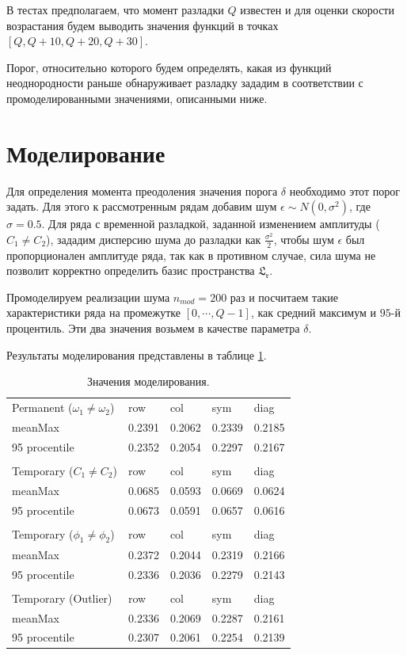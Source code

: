 \documentclass[specialist, substylefile = spbu.rtx,
			   subf, href, 12pt]{disser}
\begin{document}
В тестах предполагаем, что момент разладки $Q$ известен и для оценки скорости возрастания будем выводить значения функций в точках $[Q, Q+10, Q+20, Q+30]$.

Порог, относительно которого будем определять, какая из функций неоднородности раньше обнаруживает разладку зададим в  соответствии с промоделированными значениями, описанными ниже.

\section{Моделирование}
Для определения момента преодоления значения порога $\delta$ необходимо этот порог задать. Для этого к рассмотренным рядам добавим шум $\epsilon\sim N(0, \sigma^2)$, где $\sigma = 0.5$. Для ряда с временной разладкой, заданной изменением амплитуды ($C_1 \neq C_2$), зададим дисперсию шума до разладки как $\frac{\sigma^2}{2}$, чтобы шум $\epsilon$ был пропорционален амплитуде ряда, так как в противном случае, сила шума не позволит корректно определить базис пространства $ \mathfrak{L_r} $. 

Промоделируем реализации шума $n_{mod}=200$ раз и посчитаем такие характеристики ряда на промежутке $[0, \cdots, Q-1]$, как средний максимум и $95$-й процентиль. Эти два значения возьмем в качестве параметра $\delta$. 

Результаты моделирования представлены в таблице \ref{tab:ModellingResults}.
\begin{table}[!hhh]
	\center
	\caption{Значения моделирования.}
	\begin{tabular}{lllll}
	    Permanent ($\omega_1 \neq \omega_2$) & row & col & sym & diag \\
	    meanMax & 0.2391 & 0.2062 & 0.2339 & 0.2185 \\
	    95 procentile & 0.2352 & 0.2054 & 0.2297 & 0.2167 \\
	    &  &  &  &  \\
	    Temporary ($C_1 \neq C_2$) & row & col & sym & diag \\
	    meanMax & 0.0685 & 0.0593 & 0.0669 & 0.0624 \\
	    95 procentile & 0.0673 & 0.0591 & 0.0657 & 0.0616 \\
	    &  &  &  &  \\
	    Temporary ($\phi_1 \neq \phi_2$) & row & col & sym & diag \\
	    meanMax & 0.2372 & 0.2044 & 0.2319 & 0.2166 \\
	    95 procentile & 0.2336 & 0.2036 & 0.2279 & 0.2143 \\
	    &  &  &  &  \\
	    Temporary (Outlier) & row & col & sym & diag \\
	    meanMax & 0.2336 & 0.2069 & 0.2287 & 0.2161 \\
	    95 procentile & 0.2307 & 0.2061 & 0.2254 & 0.2139
	\end{tabular}
\label{tab:ModellingResults}
\end{table}
\end{document}
